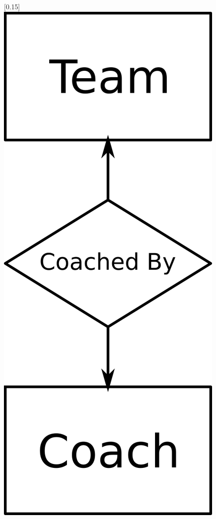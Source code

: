 \documentclass[a4paper]{article}
\begin{document}
\begin{figure}[H]
\centering
{}[0.15\linewidth]{\centering\includegraphics[width=0.6\linewidth]{entity3.png}}

\end{figure}
\end{document}
